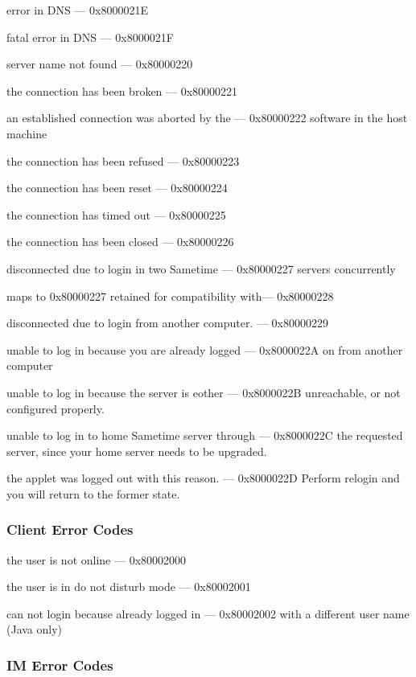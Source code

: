 \documentclass[titlepage,oneside]{book}
\begin{document}
error in DNS                                      --- 0x8000021E

fatal error in DNS                                --- 0x8000021F

server name not found                             --- 0x80000220

the connection has been broken                    --- 0x80000221

an established connection was aborted by the      --- 0x80000222
software in the host machine

the connection has been refused                   --- 0x80000223

the connection has been reset                     --- 0x80000224

the connection has timed out                      --- 0x80000225

the connection has been closed                    --- 0x80000226

disconnected due to login in two Sametime         --- 0x80000227
servers concurrently

maps to 0x80000227 retained for compatibility with--- 0x80000228

disconnected due to login from another computer.  --- 0x80000229

unable to log in because you are already logged   --- 0x8000022A
on from another computer

unable to log in because the server is eother     --- 0x8000022B
unreachable, or not configured properly.

unable to log in to home Sametime server through  --- 0x8000022C
the requested server, since your home server
needs to be upgraded.

the applet was logged out with this reason.       --- 0x8000022D
Perform relogin and you will return to the
former state.

\subsubsection{Client Error Codes}

the user is not online                            --- 0x80002000

the user is in do not disturb mode                --- 0x80002001

can not login because already logged in           --- 0x80002002
with a different user name (Java only)

\subsubsection{IM Error Codes}
\end{document}
